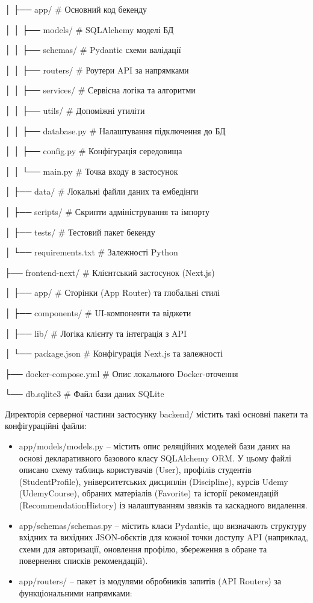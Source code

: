 \documentclass[
]{article}
\begin{document}
│ ├── app/ \# Основний код бекенду

│ │ ├── models/ \# SQLAlchemy моделі БД

│ │ ├── schemas/ \# Pydantic схеми валідації

│ │ ├── routers/ \# Роутери API за напрямками

│ │ ├── services/ \# Сервісна логіка та алгоритми

│ │ ├── utils/ \# Допоміжні утиліти

│ │ ├── database.py \# Налаштування підключення до БД

│ │ ├── config.py \# Конфігурація середовища

│ │ └── main.py \# Точка входу в застосунок

│ ├── data/ \# Локальні файли даних та ембедінги

│ ├── scripts/ \# Скрипти адміністрування та імпорту

│ ├── tests/ \# Тестовий пакет бекенду

│ └── requirements.txt \# Залежності Python

├── frontend-next/ \# Клієнтський застосунок (Next.js)

│ ├── app/ \# Сторінки (App Router) та глобальні стилі

│ ├── components/ \# UI-компоненти та віджети

│ ├── lib/ \# Логіка клієнту та інтеграція з API

│ └── package.json \# Конфігурація Next.js та залежності

├── docker-compose.yml \# Опис локального Docker-оточення

└── db.sqlite3 \# Файл бази даних SQLite

Директорія серверної частини застосунку backend/ містить такі основні
пакети та конфігураційні файли:

\begin{itemize}
\item
  app/models/models.py -- містить опис реляційних моделей бази даних на
  основі декларативного базового класу SQLAlchemy ORM. У цьому файлі
  описано схему таблиць користувачів (User), профілів студентів
  (StudentProfile), університетських дисциплін (Discipline), курсів
  Udemy (UdemyCourse), обраних матеріалів (Favorite) та історії
  рекомендацій (RecommendationHistory) із налаштуванням
  зв\textquotesingle язків та каскадного видалення.
\item
  app/schemas/schemas.py -- містить класи Pydantic, що визначають
  структуру вхідних та вихідних JSON-об\textquotesingle єктів для кожної
  точки доступу API (наприклад, схеми для авторизації, оновлення
  профілю, збереження в обране та повернення списків рекомендацій).
\item
  app/routers/ -- пакет із модулями обробників запитів (API Routers) за
  функціональними напрямками:
\end{itemize}
\end{document}
